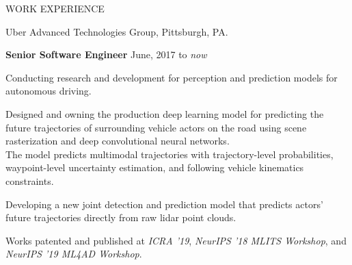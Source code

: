 \documentclass{resume} %
\begin{document}

\begin{rSection}{WORK EXPERIENCE}

\begin{rSubsection}{\hspace{-1em} Uber Advanced Technologies Group, Pittsburgh, PA.}{}{}{}
\vspace{-0.3em}
\item[] \hspace{-2em} {\bf Senior Software Engineer} \hfill June, 2017 to \emph{now}
\item Conducting research and development for perception and prediction models for autonomous driving.
\item Designed and owning the production deep learning model for predicting the future trajectories of surrounding vehicle actors on the road using scene rasterization and deep convolutional neural networks.\\
The model predicts multimodal trajectories with trajectory-level probabilities, waypoint-level uncertainty estimation, and following vehicle kinematics constraints.
\item Developing a new joint detection and prediction model that predicts actors' future trajectories directly from raw lidar point clouds.
\item Works patented and published at \emph{ICRA '19}, \emph{NeurIPS '18 MLITS Workshop}, and \emph{NeurIPS '19 ML4AD Workshop}.
\end{rSubsection}
\end{rSection}
\vspace{-.1in}
\end{document}
